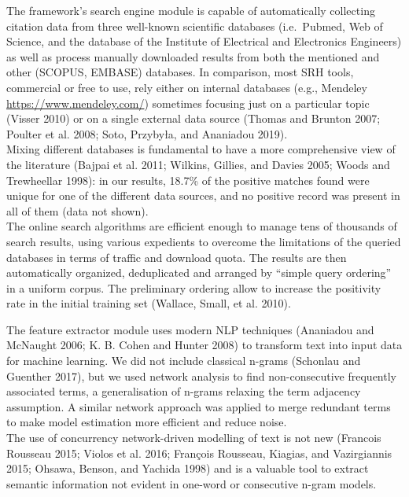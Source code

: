 \documentclass{article}
\begin{document}
The framework's search engine module is capable of automatically
collecting citation data from three well-known scientific databases
(i.e.~Pubmed, Web of Science, and the database of the Institute of
Electrical and Electronics Engineers) as well as process manually
downloaded results from both the mentioned and other (SCOPUS, EMBASE)
databases. In comparison, most SRH tools, commercial or free to use,
rely either on internal databases (e.g., Mendeley
\url{https://www.mendeley.com/}) sometimes focusing just on a particular
topic (Visser 2010) or on a single external data source (Thomas and
Brunton 2007; Poulter et al. 2008; Soto, Przybyła, and Ananiadou
2019).\\
Mixing different databases is fundamental to have a more comprehensive
view of the literature (Bajpai et al. 2011; Wilkins, Gillies, and Davies
2005; Woods and Trewheellar 1998): in our results, 18.7\% of the
positive matches found were unique for one of the different data
sources, and no positive record was present in all of them (data not
shown).\\
The online search algorithms are efficient enough to manage tens of
thousands of search results, using various expedients to overcome the
limitations of the queried databases in terms of traffic and download
quota. The results are then automatically organized, deduplicated and
arranged by ``simple query ordering'' in a uniform corpus. The
preliminary ordering allow to increase the positivity rate in the
initial training set (Wallace, Small, et al. 2010).

The feature extractor module uses modern NLP techniques (Ananiadou and
McNaught 2006; K. B. Cohen and Hunter 2008) to transform text into input
data for machine learning. We did not include classical n-grams
(Schonlau and Guenther 2017), but we used network analysis to find
non-consecutive frequently associated terms, a generalisation of n-grams
relaxing the term adjacency assumption. A similar network approach was
applied to merge redundant terms to make model estimation more efficient
and reduce noise.\\
The use of concurrency network-driven modelling of text is not new
(Francois Rousseau 2015; Violos et al. 2016; François Rousseau, Kiagias,
and Vazirgiannis 2015; Ohsawa, Benson, and Yachida 1998) and is a
valuable tool to extract semantic information not evident in one-word or
consecutive n-gram models.\\
\end{document}
